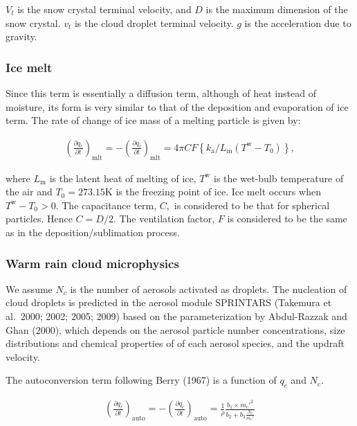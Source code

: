 \(V_{t}\) is the snow crystal terminal velocity, and \(D\) is the
maximum dimension of the snow crystal. \(v_{t}\) is the cloud droplet
terminal velocity. \(g\) is the acceleration due to gravity.

\hypertarget{ice-melt}{%
\subsubsection{Ice melt}\label{ice-melt}}

Since this term is essentially a diffusion term, although of heat
instead of moisture, its form is very similar to that of the deposition
and evaporation of ice term. The rate of change of ice mass of a melting
particle is given by:

\begin{eqnarray}
\left(\frac{\partial q_r}{\partial t}\right)_{\text {mlt}}
=-\left(\frac{\partial q_i}{\partial t}\right)_{\text {mlt}}
=4 \pi C F\left\{k_{\mathrm{a}} / L_{\mathrm{m}}\left(T^{\mathrm{w}}-T_{0}\right)\right\},
\end{eqnarray}

where \(L_{\mathrm{m}}\) is the latent heat of melting of ice,
\(T^{\mathrm{w}}\) is the wet-bulb temperature of the air and
\(T_{0}=273.15\mathrm{K}\) is the freezing point of ice. Ice melt occurs
when \(T^{\mathrm{w}}-T_{0}>0\). The capacitance term, \(C,\) is
considered to be that for spherical particles. Hence \(C=D / 2 .\) The
ventilation factor, \(F\) is considered to be the same as in the
deposition/sublimation process.

\hypertarget{warm-rain-cloud-microphysics}{%
\subsubsection{Warm rain cloud
microphysics}\label{warm-rain-cloud-microphysics}}

We assume \(N_c\) is the number of aerosols activated as droplets. The
nucleation of cloud droplets is predicted in the aerosol module
SPRINTARS (Takemura et al.~2000; 2002; 2005; 2009) based on the
parameterization by Abdul-Razzak and Ghan (2000), which depends on the
aerosol particle number concentrations, size distributions and chemical
properties of of each aerosol species, and the updraft velocity.

The autoconversion term following Berry (1967) is a function of \(q_c\)
and \(N_c\).

\begin{eqnarray}
\left(\frac{\partial q_r}{\partial t}\right)_{\text {auto}}
=-\left(\frac{\partial q_c}{\partial t}\right)_{\text {auto}}
=\frac{1}{\rho}
\frac{b_1 \times m_{c}'^{2}}{b_2+b_3 \frac{N_{c}}{m_{c}'}}
\end{eqnarray}

